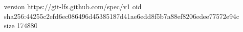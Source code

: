 version https://git-lfs.github.com/spec/v1
oid sha256:44255c2efd6ec086496d45385187d41ae6edd8f5b7a88ef8206edee77572e94c
size 174880
